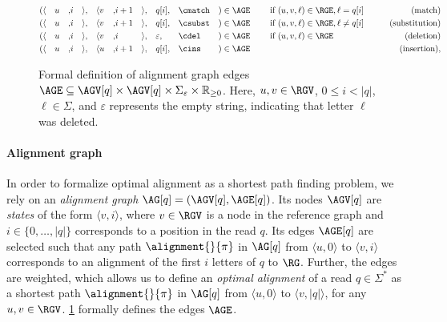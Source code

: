 \begin{figure}[t]
	\begin{alignat*}{20}
		(
			&\langle&& u &,& i   &\rangle&,
			&\langle&  v &,& i+1 &\rangle&,
			&&q[i],
			&&\cmatch
		&)&\in \AGE
		&& \quad \text{ if } (u,v,\ell) \in \RGE, \ell = q[i] & \qquad \text{(match)}\\
		(
			&\langle&& u &,& i   &\rangle&,
			&\langle&  v &,& i+1 &\rangle&,
			&&q[i],
			&&\csubst
		&) &\in \AGE
		&& \quad \text{ if } (u,v,\ell) \in \RGE, \ell \neq q[i] & \qquad \text{(substitution)}\\
		(
			&\langle&& u &,& i &\rangle&,
			&\langle&  v &,& i &\rangle&,
			&&\varepsilon,
			&&\cdel
		&) &\in \AGE
		&& \quad \text{ if } (u,v,\ell) \in \RGE & \qquad \text{(deletion)}\\
		(
			&\langle&& u &,& i   &\rangle&,
			&\langle&  u &,& i+1 &\rangle&,
			&&q[i],
			&&\cins
		&) &\in \AGE
		&& \quad & \qquad \text{(insertion)},
	\end{alignat*}
	\caption[Formal definition of the alignment graph]{Formal definition of
	alignment graph edges $\AGE \subseteq \AGV[q] \times \AGV[q] \times
	\Sigma_\varepsilon \times \mathbb{R}_{\geq 0}$. Here, $u,v \in \RGV$, $0
	\leq i < |q|$, $\ell \in \Sigma$, and $\varepsilon$ represents the empty
	string, indicating that letter $\ell$ was deleted.}
	\label{fig:graph-edges}
\end{figure}

\paragraph{Alignment graph}
%
In order to formalize optimal alignment as a shortest path finding problem, we
rely on an \emph{alignment graph} $\AG[q]=(\AGV[q],\AGE[q])$.
%
Its nodes $\AGV[q]$ are \emph{states} of the form $\langle v, i \rangle$, where
$v \in \RGV$ is a node in the reference graph and $i \in \{0, \dots, |q|\}$
corresponds to a position in the read $q$.
%
Its edges $\AGE[q]$ are selected such that any path $\alignment{}{\pi}$ in
$\AG[q]$ from $\langle u, 0 \rangle$ to $\langle v, i \rangle$ corresponds to an
alignment of the first $i$ letters of $q$ to $\RG$.
%
Further, the edges are weighted, which allows us to define an \emph{optimal
alignment} of a read $q \in \Sigma^*$ as a shortest path $\alignment{}{\pi}$ in
$\AG[q]$ from $\langle u, 0 \rangle$ to $\langle v, |q| \rangle$, for any $u, v
\in \RGV$.
%
\cref{fig:graph-edges} formally defines the edges $\AGE$.

